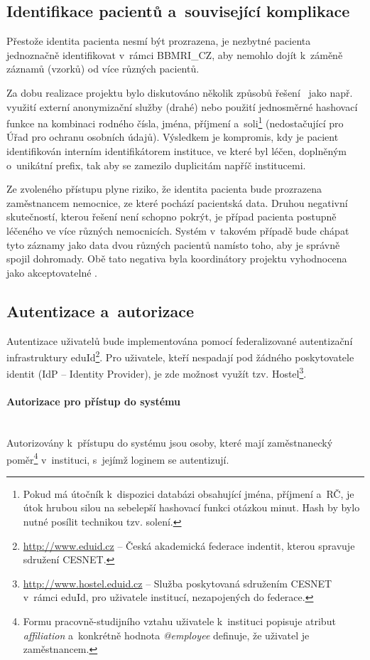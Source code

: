 \documentclass[11pt, final, oneside]{fithesis2}
\newcommand{\paragraphNewLine}[1]{\paragraph*{#1}\mbox{}\\}
\newcommand{\ProjectName}{\mbox{BBMRI\_CZ}\xspace}
\begin{document}
\subsection{Identifikace pacientů a~související komplikace}
Přestože identita pacienta nesmí být prozrazena, je nezbytné pacienta jednoznačně identifikovat v~rámci \ProjectName, aby nemohlo dojít k~záměně záznamů (vzorků) od více různých pacientů. 

Za dobu realizace projektu bylo diskutováno několik způsobů řešení~\cite{ARCH_2014_1_25} jako např. využití externí anonymizační služby (drahé) nebo použití jednosměrné hashovací funkce na kombinaci rodného čísla, jména, příjmení a~soli\footnote{Pokud má útočník k~dispozici databázi obsahující jména, příjmení a~RČ, je útok hrubou silou na sebelepší hashovací funkci otázkou minut. Hash by bylo nutné posílit technikou tzv. solení.} (nedostačující pro Úřad pro ochranu osobních údajů). 
Výsledkem je kompromis, kdy je pacient identifikován interním identifikátorem instituce, ve které byl léčen, doplněným o~unikátní prefix, tak aby se zamezilo duplicitám napříč institucemi.

Ze zvoleného přístupu plyne riziko, že identita pacienta bude prozrazena zaměstnancem nemocnice, ze které pochází pacientská data. Druhou negativní skutečností, kterou řešení není schopno pokrýt, je případ pacienta postupně léčeného ve více různých nemocnicích. Systém v~takovém případě bude chápat tyto záznamy jako data dvou různých pacientů namísto toho, aby je správně spojil dohromady. Obě tato negativa byla koordinátory projektu vyhodnocena jako akceptovatelné .

\subsection{Autentizace a~autorizace}\label{chapter:analysis:subsection:authorization}
Autentizace uživatelů bude implementována pomocí federalizované autentizační infrastruktury eduId\footnote{\url{http://www.eduid.cz} -- Česká akademická federace indentit, kterou spravuje sdružení CESNET.}. Pro uživatele, kteří nespadají pod žádného poskytovatele identit (IdP -- Identity Provider), je zde možnost využít tzv. Hostel\footnote{\url{http://www.hostel.eduid.cz} -- Služba poskytovaná sdružením CESNET v~rámci eduId, pro uživatele institucí, nezapojených do federace.}. 

\paragraphNewLine{Autorizace pro přístup do systému}
Autorizovány k~přístupu do systému jsou osoby, které mají zaměstnanecký poměr\footnote{Formu pracovně-studijního vztahu uživatele k~instituci popisuje atribut \textit{affiliation} a~konkrétně hodnota \textit{@employee} definuje, že uživatel je zaměstnancem.} v~instituci, s~jejímž loginem se autentizují.
\end{document}

